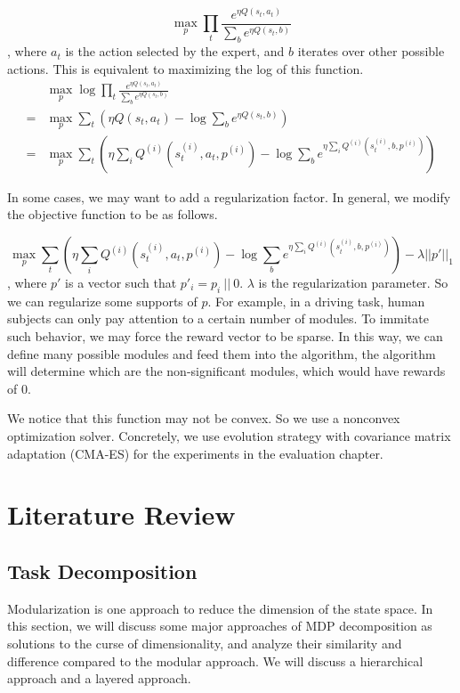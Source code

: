 \documentclass[12pt]{report}	%
\theoremstyle{definition}
\theoremstyle{remark}
\begin{document}
\begin{equation}
\label{eq:irl}
\max_{p} \prod_t \frac{e^{\eta Q(s_t, a_t)}}{\sum_b e^{\eta Q(s_t,
b)}}
\end{equation}, where $a_t$ is the action selected by the expert, and $b$
iterates over other possible actions. This is equivalent to maximizing the log
of this function.
\begin{align}
&\max_{p} \log \prod_t \frac{e^{\eta Q(s_t, a_t)}}{\sum_b e^{\eta Q(s_t,
b)}}\\
=&\max_{p} \sum_t (\eta Q(s_t, a_t) - \log \sum_b e^{\eta Q(s_t, b)})
\label{eq:irllog}\\
=&\max_{p} \sum_t (\eta \sum_i Q^{(i)}(s_t^{(i)}, a_t, p^{(i)}) - \log \sum_b e^{\eta \sum_i
Q^{(i)}(s_t^{(i)}, b, p^{(i)})})
\end{align}

In some cases, we may want to add a regularization factor. In general, we
modify the objective function to be as follows.

\begin{equation}
\label{eq:irl}
\max_{p} \sum_t (\eta \sum_i Q^{(i)}(s_t^{(i)}, a_t, p^{(i)}) - \log \sum_b e^{\eta \sum_i
Q^{(i)}(s_t^{(i)}, b, p^{(i)})})
- \lambda ||p'||_1
\end{equation},
where $p'$ is a vector such that $p'_i = p_i\ ||\ 0$. $\lambda$ is the
regularization parameter. So we can regularize some supports of $p$. For
example, in a driving task, human subjects can only pay attention to a certain
number of modules. To immitate such behavior, we may force the reward vector to
be sparse. In this way, we can define many possible modules and feed them into the
algorithm, the algorithm will determine which are the non-significant modules,
which would have rewards of 0.

We notice that this function may not be convex. So we use a nonconvex optimization
solver. Concretely, we use evolution strategy with covariance matrix adaptation (CMA-ES)
\cite{hansen2003reducing} for the experiments in the evaluation chapter.


\chapter{Literature Review}
\label{chp:lr}
\section{Task Decomposition}

Modularization is one approach to reduce the dimension of the state space. In
this section, we will discuss some major approaches of MDP decomposition as
solutions to the curse of dimensionality, and analyze their similarity and
difference compared to the modular approach. We will discuss a hierarchical
approach and a layered approach.
\end{document}
